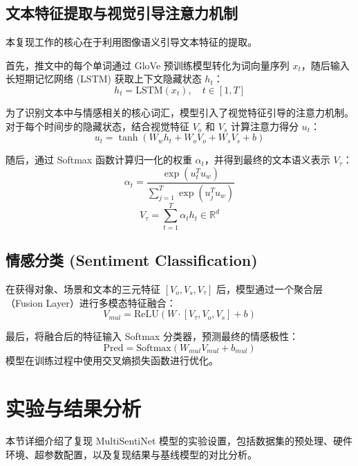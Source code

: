 \documentclass[conference, 12pt,onecolumn]{IEEEtran}
\begin{document}
\subsection{文本特征提取与视觉引导注意力机制}
本复现工作的核心在于利用图像语义引导文本特征的提取。

首先，推文中的每个单词通过 GloVe 预训练模型转化为词向量序列 $x_t$，随后输入长短期记忆网络 (LSTM) 获取上下文隐藏状态 $h_t$：
\begin{equation}
    h_t = \text{LSTM}(x_t), \quad t \in [1, T]
\end{equation}

为了识别文本中与情感相关的核心词汇，模型引入了视觉特征引导的注意力机制。对于每个时间步的隐藏状态，结合视觉特征 $V_o$ 和 $V_s$ 计算注意力得分 $u_t$：
\begin{equation}
    u_t = \tanh(W_w h_t + W_o V_o + W_s V_s + b)
\end{equation}

随后，通过 Softmax 函数计算归一化的权重 $\alpha_t$，并得到最终的文本语义表示 $V_{\tau}$：
\begin{equation}
    \alpha_t = \frac{\exp(u_t^T u_w)}{\sum_{j=1}^T \exp(u_j^T u_w)}
\end{equation}
\begin{equation}
    V_{\tau} = \sum_{t=1}^T \alpha_t h_t \in \mathbb{R}^d
\end{equation}

\subsection{情感分类 (Sentiment Classification)}
在获得对象、场景和文本的三元特征 $[V_o, V_s, V_{\tau}]$ 后，模型通过一个聚合层（Fusion Layer）进行多模态特征融合：
\begin{equation}
    V_{mul} = \text{ReLU}(W \cdot [V_{\tau}, V_o, V_s] + b)
\end{equation}

最后，将融合后的特征输入 Softmax 分类器，预测最终的情感极性：
\begin{equation}
    \text{Pred} = \text{Softmax}(W_{mul} V_{mul} + b_{mul})
\end{equation}
模型在训练过程中使用交叉熵损失函数进行优化。
\section{实验与结果分析}

本节详细介绍了复现 MultiSentiNet 模型的实验设置，包括数据集的预处理、硬件环境、超参数配置，以及复现结果与基线模型的对比分析。
\end{document}
